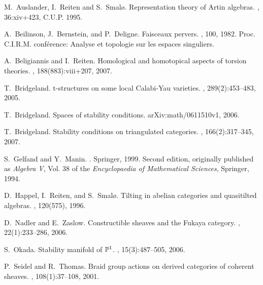 \documentclass{article}
\theoremstyle{plain}
\theoremstyle{definition}
\theoremstyle{remark}
\begin{document}
\begin{thebibliography}{99}

M.~Auslander, I.~Reiten and S.~Smal\o.
\newblock Representation theory of {A}rtin algebras.
, 36:xiv+423, {C.U.P.} 1995.

A.~Beilinson, J.~Bernstein, and P.~Deligne.
\newblock Faisceaux pervers.
, 100, 1982.
\newblock Proc. C.I.R.M. conf\'erence: Analyse et topologie sur les espaces
  singuliers.

A.~Beligiannis and I.~Reiten.
\newblock Homological and homotopical aspects of torsion theories.
, 188(883):viii+207, 2007.

T.~Bridgeland.
\newblock t-structures on some local {C}alabi-{Y}au varieties.
, 289(2):453--483, 2005.

T.~Bridgeland.
\newblock Spaces of stability conditions.
\newblock arXiv:math/0611510v1, 2006.

T.~Bridgeland.
\newblock Stability conditions on triangulated categories.
, 166(2):317--345, 2007.

S.~Gelfand and Y.~Manin.
.
\newblock Springer, 1999.
\newblock Second edition, originally published as \emph{Algebra V}, Vol. 38 of
  the {\em Encyclopaedia of Mathematical Sciences}, Springer, 1994.

D.~Happel, I.~Reiten, and S.~Smal\o.
\newblock Tilting in abelian categories and quasitilted algebras.
, 120(575), 1996.

D.~Nadler and E.~Zaslow.
\newblock Constructible sheaves and the {F}ukaya category.
, 22(1):233--286, 2006.

S.~Okada.
\newblock Stability manifold of {$\mathbb{P}\sp 1$}.
, 15(3):487--505, 2006.

P.~Seidel and R.~Thomas.
\newblock Braid group actions on derived categories of coherent sheaves.
, 108(1):37--108, 2001.

\end{thebibliography}
\end{document}
